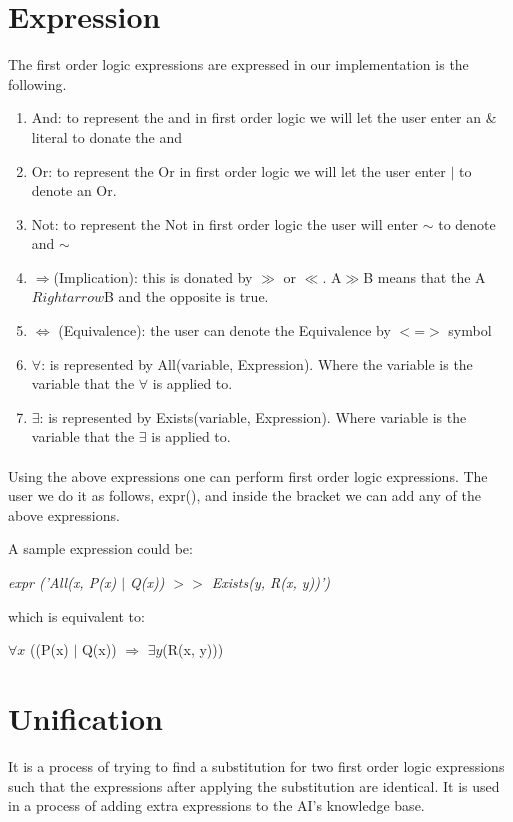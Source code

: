 \label{chap:assign1}{
\section{Expression}
The first order logic expressions are expressed in our implementation is the following.

\begin{enumerate}
\item{And: to represent the and in first order logic we will let the user enter an \& literal to donate the and}
\item{Or: to represent the Or in first order logic we will let the user enter $\mid$ to denote an Or.}
\item{Not: to represent the Not in first order logic the user will enter $\sim$ to denote and $\sim$}
\item{$\Rightarrow$(Implication): this is donated by $\gg$ or $\ll$. A$\gg$B means that the A $Rightarrow$B and the opposite is true.}
\item{$\Leftrightarrow$ (Equivalence): the user can denote the Equivalence by $<$=$>$ symbol}
\item{$\forall$: is represented by All(variable, Expression). Where the variable is the variable that the $\forall$ is applied to.}
\item{$\exists$: is represented by Exists(variable, Expression). Where variable is the variable that the $\exists$ is applied to.}
\end{enumerate}


\paragraph*{}
Using the above expressions one can perform first order logic expressions. The user we do it as follows, expr(), and inside the bracket we can add any of the above expressions. 

A sample expression could be:



\textit{expr ('All(x, P(x) $\mid$ Q(x)) $>$$>$ Exists(y, R(x, y))')}

which is equivalent to:

$\forall{x}$ ((P(x) $\mid$ Q(x)) $\Rightarrow$ $\exists{y}$(R(x, y)))

\section{Unification}
It is a process of trying to find a substitution for two first order logic expressions such that the expressions after applying the substitution are identical. It is used in a process of adding extra expressions to the AI's knowledge base.

}
